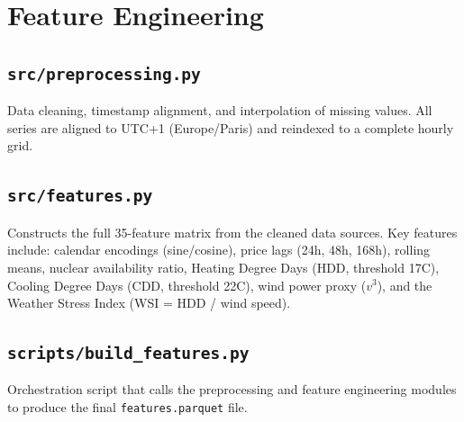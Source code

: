 \documentclass[11pt, a4paper, oneside]{report}
\begin{document}
\chapter{Feature Engineering}

\section{\texttt{src/preprocessing.py}}

Data cleaning, timestamp alignment, and interpolation of missing values.
All series are aligned to UTC+1 (Europe/Paris) and reindexed to a complete
hourly grid.



\clearpage

\section{\texttt{src/features.py}}

Constructs the full 35-feature matrix from the cleaned data sources.
Key features include: calendar encodings (sine/cosine), price lags
(24h, 48h, 168h), rolling means, nuclear availability ratio,
Heating Degree Days (HDD, threshold 17\textdegree C), Cooling Degree Days
(CDD, threshold 22\textdegree C), wind power proxy ($v^3$), and the
Weather Stress Index (WSI = HDD / wind speed).



\clearpage

\section{\texttt{scripts/build\_features.py}}

Orchestration script that calls the preprocessing and feature engineering
modules to produce the final \texttt{features.parquet} file.



\clearpage

\end{document}
